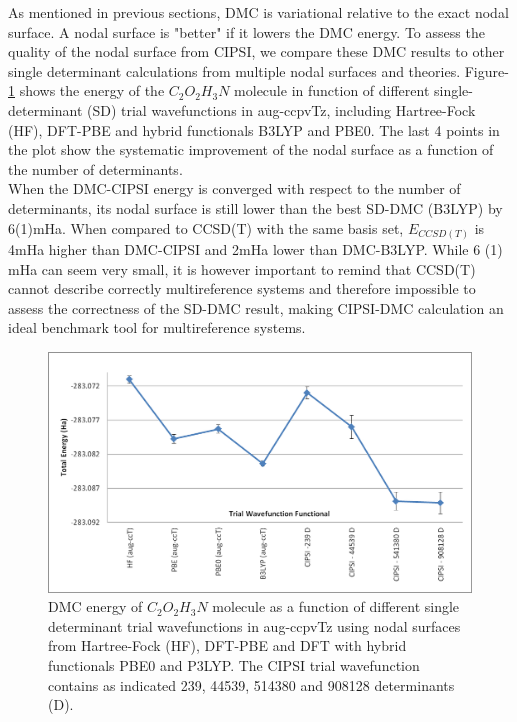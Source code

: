 As mentioned in previous sections, DMC is variational relative to the exact nodal surface. A nodal surface is "better" if it lowers the DMC energy. To assess the quality of the nodal surface from CIPSI, we compare these DMC results to other single determinant calculations from multiple nodal surfaces and theories. Figure-\ref{fig:CIPSI-DMC} shows the energy of the $C_2O_2H_3N$ molecule in function of different single-determinant (SD) trial wavefunctions in aug-ccpvTz, including Hartree-Fock (HF), DFT-PBE and hybrid functionals B3LYP and PBE0. The last 4 points in the plot show the systematic improvement of the nodal surface as a function of the number of determinants. \\
When the DMC-CIPSI energy is converged with respect to the number of determinants, its nodal surface is still lower than the best SD-DMC (B3LYP) by 6(1)mHa. When compared to CCSD(T) with the same basis set, $E_{CCSD(T)}$ is 4mHa higher than DMC-CIPSI and 2mHa lower than DMC-B3LYP. While 6 (1) mHa can seem very small, it is however important to remind that CCSD(T) cannot describe correctly multireference systems and therefore impossible to assess the correctness of the SD-DMC result, making CIPSI-DMC calculation an ideal benchmark tool for multireference systems.  

\begin{figure}
\begin{center}
\includegraphics[trim = 2mm 2mm 2mm 2mm, clip,width=0.9
\columnwidth]{figures/DMC-Multidet.jpg}
\end{center}
\caption{DMC energy of $C_2O_2H_3N$ molecule as a function of different single determinant trial wavefunctions in aug-ccpvTz using nodal surfaces from Hartree-Fock (HF), DFT-PBE and DFT with hybrid functionals PBE0 and P3LYP. The CIPSI trial wavefunction contains as indicated 239, 44539, 514380 and 908128 determinants (D). 
\label{fig:CIPSI-DMC}
}
\end{figure}